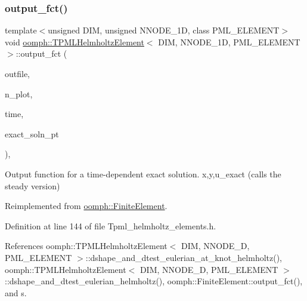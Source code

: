 \subsubsection{\texorpdfstring{output\+\_\+fct()}{output\_fct()}\hspace{0.1cm}{\footnotesize\ttfamily [2/2]}}
{\footnotesize\ttfamily template$<$unsigned D\+IM, unsigned N\+N\+O\+D\+E\+\_\+1D, class P\+M\+L\+\_\+\+E\+L\+E\+M\+E\+NT$>$ \\
void \hyperlink{classoomph_1_1TPMLHelmholtzElement}{oomph\+::\+T\+P\+M\+L\+Helmholtz\+Element}$<$ D\+IM, N\+N\+O\+D\+E\+\_\+1D, P\+M\+L\+\_\+\+E\+L\+E\+M\+E\+NT $>$\+::output\+\_\+fct (\begin{DoxyParamCaption}\item[{std\+::ostream \&}]{outfile,  }\item[{const unsigned \&}]{n\+\_\+plot,  }\item[{const double \&}]{time,  }\item[{\hyperlink{classoomph_1_1FiniteElement_ad4ecf2b61b158a4b4d351a60d23c633e}{Finite\+Element\+::\+Unsteady\+Exact\+Solution\+Fct\+Pt}}]{exact\+\_\+soln\+\_\+pt }\end{DoxyParamCaption})\hspace{0.3cm}{\ttfamily [inline]}, {\ttfamily [virtual]}}



Output function for a time-\/dependent exact solution. x,y,u\+\_\+exact (calls the steady version) 



Reimplemented from \hyperlink{classoomph_1_1FiniteElement_a2a8426dccd57b927be0ae0eec00d0479}{oomph\+::\+Finite\+Element}.



Definition at line 144 of file Tpml\+\_\+helmholtz\+\_\+elements.\+h.



References oomph\+::\+T\+P\+M\+L\+Helmholtz\+Element$<$ D\+I\+M, N\+N\+O\+D\+E\+\_\+D, P\+M\+L\+\_\+\+E\+L\+E\+M\+E\+N\+T $>$\+::dshape\+\_\+and\+\_\+dtest\+\_\+eulerian\+\_\+at\+\_\+knot\+\_\+helmholtz(), oomph\+::\+T\+P\+M\+L\+Helmholtz\+Element$<$ D\+I\+M, N\+N\+O\+D\+E\+\_\+D, P\+M\+L\+\_\+\+E\+L\+E\+M\+E\+N\+T $>$\+::dshape\+\_\+and\+\_\+dtest\+\_\+eulerian\+\_\+helmholtz(), oomph\+::\+Finite\+Element\+::output\+\_\+fct(), and s.

\mbox{\label{classoomph_1_1TPMLHelmholtzElement_a8fbaaffdd7addb9e6912d92a2fa406c4}} 
